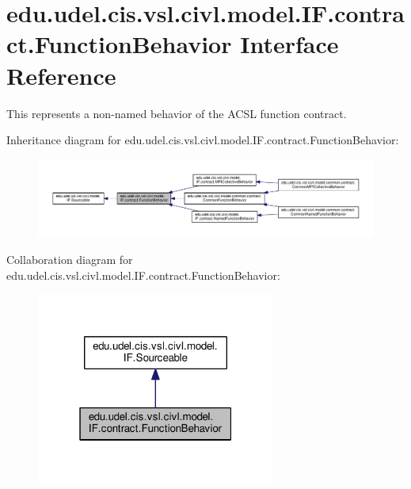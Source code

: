 \hypertarget{interfaceedu_1_1udel_1_1cis_1_1vsl_1_1civl_1_1model_1_1IF_1_1contract_1_1FunctionBehavior}{}\section{edu.\+udel.\+cis.\+vsl.\+civl.\+model.\+I\+F.\+contract.\+Function\+Behavior Interface Reference}
\label{interfaceedu_1_1udel_1_1cis_1_1vsl_1_1civl_1_1model_1_1IF_1_1contract_1_1FunctionBehavior}


This represents a non-\/named behavior of the A\+C\+S\+L function contract.  




Inheritance diagram for edu.\+udel.\+cis.\+vsl.\+civl.\+model.\+I\+F.\+contract.\+Function\+Behavior\+:
\nopagebreak
\begin{figure}[H]
\begin{center}
\leavevmode
\includegraphics[width=350pt]{interfaceedu_1_1udel_1_1cis_1_1vsl_1_1civl_1_1model_1_1IF_1_1contract_1_1FunctionBehavior__inherit__graph}
\end{center}
\end{figure}


Collaboration diagram for edu.\+udel.\+cis.\+vsl.\+civl.\+model.\+I\+F.\+contract.\+Function\+Behavior\+:
\nopagebreak
\begin{figure}[H]
\begin{center}
\leavevmode
\includegraphics[width=223pt]{interfaceedu_1_1udel_1_1cis_1_1vsl_1_1civl_1_1model_1_1IF_1_1contract_1_1FunctionBehavior__coll__graph}
\end{center}
\end{figure}

